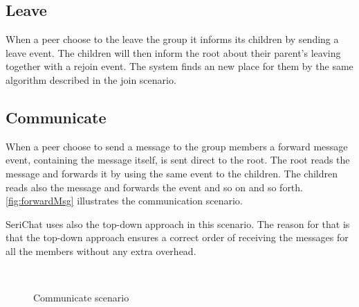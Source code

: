 \subsection{Leave}
When a peer choose to the leave the group it informs its children by sending a leave event. The children will then inform the root about their parent's leaving together with a rejoin event. The system finds an new place for them by the same algorithm described in the join scenario.



\subsection{Communicate}
When a peer choose to send a message to the group members a forward message event, containing the message itself,  is sent direct to the root. The root reads the message and forwards it by using the same event to the children. The children reads also the message and forwards the event and so on and so forth.
\autoref{fig:forwardMsg} illustrates the communication scenario.

SeriChat uses also the top-down approach in this scenario. The reason for that is that the top-down approach ensures a correct order of receiving the messages for all the members without any extra overhead.

\begin{figure}[bth]
	\myfloatalign
	 \quad
	 \\
	\caption{Communicate scenario}\label{fig:forwardMsg}
\end{figure}

